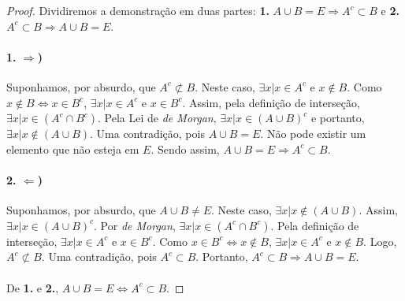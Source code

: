 \documentclass[9pt,twocolumn,a4paper]{article}
\begin{document}
    \begin{proof}
    Dividiremos a demonstração em duas partes: \textbf{1.} $A \cup B = E \Rightarrow A^c \subset B$ e \textbf{2.} $A^c \subset B \Rightarrow A \cup B = E$.

    \paragraph{1. $\Rightarrow$)}
    Suponhamos, por absurdo, que $A^c \not\subset B$. Neste caso, $\exists x| x \in A^c$ e $x \not\in B$. Como $x \not\in B \Leftrightarrow x \in B^c$, $\exists x| x \in A^c$ e $x \in B^c$. Assim, pela definição de interseção, $\exists x| x \in (A^c \cap B^c)$. Pela Lei de \textit{de Morgan}, $\exists x| x \in (A \cup B)^c$ e portanto, $\exists x | x \not\in (A \cup B)$. Uma contradição, pois $A \cup B = E$. Não pode existir um elemento que não esteja em $E$. Sendo assim, $A \cup B = E \Rightarrow A^c \subset B$.

    \paragraph{2. $\Leftarrow$)}
    Suponhamos, por absurdo, que $A \cup B \not= E$. Neste caso, $\exists x | x \not\in (A \cup B)$. Assim, $\exists x | x \in (A \cup B)^c$. Por \textit{de Morgan}, $\exists x | x \in (A^c \cap B^c)$. Pela definição de interseção, $\exists x | x \in A^c$ e $x \in B^c$. Como $x \in B^c \Leftrightarrow x \not\in B$, $\exists x | x \in A^c$ e $x \not\in B$. Logo, $A^c \not\subset B$. Uma contradição, pois $A^c \subset B$. Portanto, $A^c \subset B \Rightarrow A \cup B = E$.
    
    \paragraph{}
    De \textbf{1.} e \textbf{2.}, $A \cup B = E \Leftrightarrow A^c \subset B$.
    \end{proof}
\end{document}
